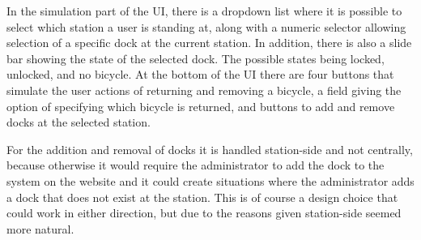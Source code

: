 In the simulation part of the UI, there is a dropdown list where it is possible to select which station a user is standing at, along with a numeric selector allowing selection of a specific dock at the current station.
In addition, there is also a slide bar showing the state of the selected dock.
The possible states being locked, unlocked, and no bicycle.
At the bottom of the UI there are four buttons that simulate the user actions of returning and removing a bicycle, a field giving the option of specifying which bicycle is returned, and buttons to add and remove docks at the selected station.

For the addition and removal of docks it is handled station-side and not centrally, because otherwise it would require the administrator to add the dock to the system on the website and it could create situations where the administrator adds a dock that does not exist at the station.  
This is of course a design choice that could work in either direction, but due to the reasons given station-side seemed more natural.